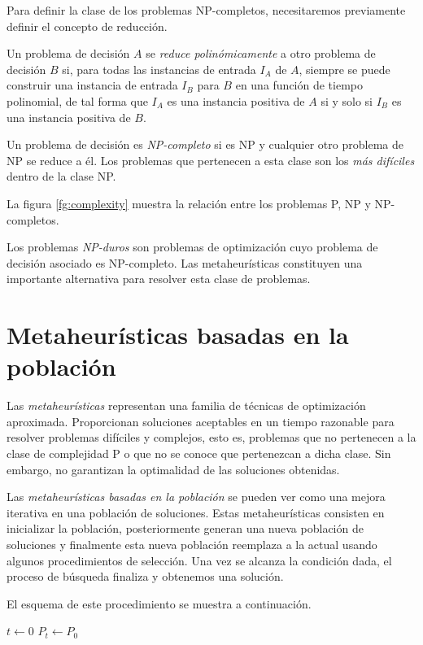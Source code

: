 Para definir la clase de los problemas NP-completos, necesitaremos previamente definir el concepto de reducción.

\begin{definition}
    Un problema de decisión $A$ se \emph{reduce polinómicamente} a otro problema de decisión $B$ si, para todas las instancias de entrada $I_A$ de $A$, siempre se puede construir una instancia de entrada $I_B$ para $B$ en una función de tiempo polinomial, de tal forma que $I_A$ es una instancia positiva de $A$ si y solo si $I_B$ es una instancia positiva de $B$.
\end{definition}

Un problema de decisión es \emph{NP-completo} si es NP y cualquier otro problema de NP se reduce a él. Los problemas que pertenecen a esta clase son los \emph{más difíciles} dentro de la clase NP.

La figura \ref{fg:complexity} muestra la relación entre los problemas P, NP y NP-completos.

Los problemas \emph{NP-duros} son problemas de optimización cuyo problema de decisión asociado es NP-completo. Las metaheurísticas constituyen una importante alternativa para resolver esta clase de problemas.

\section{Metaheurísticas basadas en la población}

Las \emph{metaheurísticas} representan una familia de técnicas de optimización aproximada. Proporcionan soluciones aceptables en un tiempo razonable para resolver problemas difíciles y complejos, esto es, problemas que no pertenecen a la clase de complejidad P o que no se conoce que pertenezcan a dicha clase. Sin embargo, no garantizan la optimalidad de las soluciones obtenidas.

Las \emph{metaheurísticas basadas en la población} se pueden ver como una mejora iterativa en una población de soluciones. Estas metaheurísticas consisten en inicializar la población, posteriormente generan una nueva población de soluciones y finalmente esta nueva población reemplaza a la actual usando algunos procedimientos de selección. Una vez se alcanza la condición dada, el proceso de búsqueda finaliza y obtenemos una solución.

El esquema de este procedimiento se muestra a continuación.

\begin{Ualgorithm}[H]
    \small
    \DontPrintSemicolon
    $t \longleftarrow 0$\;
    $P_t \longleftarrow P_0$ 
    
\end{Ualgorithm}

